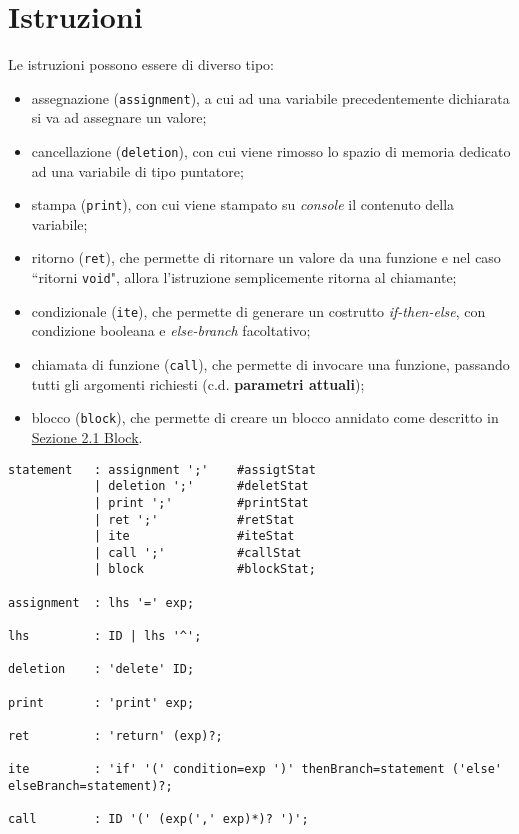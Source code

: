 \documentclass[../report.tex]{subfiles}
\begin{document}
\section{Istruzioni}\label{s:istruzioni}
Le istruzioni possono essere di diverso tipo:
\begin{itemize}
    \item assegnazione (\verb|assignment|), a cui ad una variabile precedentemente dichiarata si va ad assegnare un valore;
    \item cancellazione (\verb|deletion|), con cui viene rimosso lo spazio di memoria dedicato ad una variabile di tipo puntatore;
    \item stampa (\verb|print|), con cui viene stampato su \textit{console} il contenuto della variabile;
    \item ritorno (\verb|ret|), che permette di ritornare un valore da una funzione e nel caso ``ritorni \verb|void|", allora l'istruzione semplicemente ritorna al chiamante;
    \item condizionale (\verb|ite|), che permette di generare un costrutto \textit{if-then-else}, con condizione booleana e \textit{else-branch} facoltativo;
    \item chiamata di funzione (\verb|call|), che permette di invocare una funzione, passando tutti gli argomenti richiesti (c.d. \textbf{parametri attuali});
    \item blocco (\verb|block|), che permette di creare un blocco annidato come descritto in \hyperref[s:block]{Sezione 2.1 Block}.
\end{itemize}
\begin{lstlisting}[style=antlr]
statement   : assignment ';'    #assigtStat
            | deletion ';'      #deletStat
            | print ';'         #printStat
            | ret ';'           #retStat
            | ite               #iteStat
            | call ';'          #callStat
            | block             #blockStat;

assignment  : lhs '=' exp;

lhs         : ID | lhs '^';

deletion    : 'delete' ID;

print       : 'print' exp;

ret         : 'return' (exp)?;

ite         : 'if' '(' condition=exp ')' thenBranch=statement ('else' elseBranch=statement)?;

call        : ID '(' (exp(',' exp)*)? ')';
\end{lstlisting}
\end{document}
